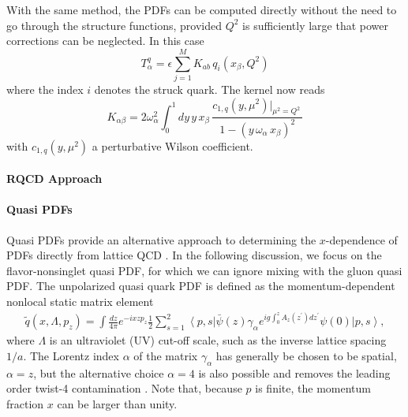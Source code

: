 With the same method, the PDFs can be computed directly without the need to go through the structure functions, provided $Q^2$ is
sufficiently large that power corrections can be neglected. In this case
\begin{equation}
T_\alpha^q = \epsilon \sum_{j=1}^M K_{ab}\, q_i(x_\beta,Q^2) 
\end{equation}
where the index $i$ denotes the struck quark. The kernel now reads
\begin{equation}
K_{\alpha\beta} =2 \omega_\alpha^2 \int_0^1 dy\,y\,x_\beta\, \frac{c_{1,q}(y,\mu^2)|_{\mu^2=Q^2}\, }{1-(y\,\omega_\alpha\, x_\beta)^2}
\end{equation}
with $c_{1,q}(y,\mu^2)$ a perturbative Wilson coefficient.

\paragraph{RQCD Approach}

%

\paragraph{Quasi PDFs}
Quasi PDFs provide an alternative approach to determining the $x$-dependence of PDFs directly from lattice QCD \cite{Ji:2013dva,Ji:2014gla}. In the following discussion, we focus on the flavor-nonsinglet quasi PDF, for which we can ignore mixing with the gluon quasi PDF. The unpolarized quasi quark PDF is defined as the momentum-dependent
nonlocal static matrix element
\begin{align}\label{eq:qPDF}
\widetilde{q}(x,\Lambda,p_z)  = \int \frac{dz}{4\pi} e^{-i x z p_z} 
\frac{1}{2}\sum_{s=1}^2\left\langle p,s\right\vert \bar{\psi}(z)\gamma_\alpha e^{ig\int_0^z
A_z(z^\prime) dz^\prime} \psi(0) \left\vert p,s\right\rangle ,
\end{align}
where $\Lambda$ is an ultraviolet (UV) cut-off scale, such as the inverse lattice spacing $1/a$. The Lorentz index $\alpha$ of the matrix $\gamma_\alpha$ has generally be chosen to be spatial, $\alpha = z$, but the alternative choice $\alpha = 4$ is also possible and removes the leading order twist-4 contamination \cite{Radyushkin:2016hsy}. Note that, because $p$ is finite, the momentum fraction $x$ can be larger than unity.

